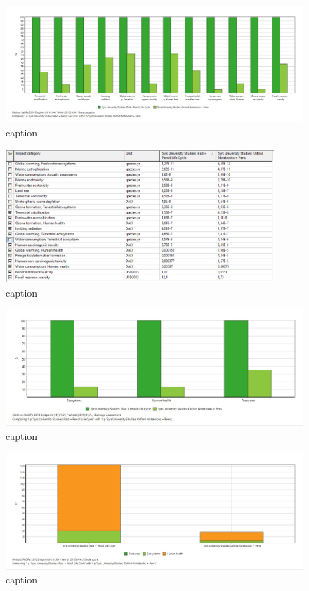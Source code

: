 \begin{figure}[H]
    \centering
    \includegraphics[width=\textwidth]{images/RES_100/Characterization_RES_100.JPG}
    \caption{caption}\label{fig:characterization_RES_100}
\end{figure}

\begin{figure}[H]
    \centering
    \includegraphics[width=0.9\textwidth]{images/RES_100/Characterization_Table_RES_100.PNG}
    \caption{caption}\label{fig:characterization_table_RES_100}
\end{figure}

\begin{figure}[H]
    \centering
    \includegraphics[width=\textwidth]{images/RES_100/Damage_Assessment_RES_100.JPG}
    \caption{caption}\label{fig:damage_assessment_RES_100}
\end{figure}

\begin{figure}[H]
    \centering
    \includegraphics[width=\textwidth]{images/RES_100/Single_Score_RES_100.JPG}
    \caption{caption}\label{fig:single_score_RES100}
\end{figure}